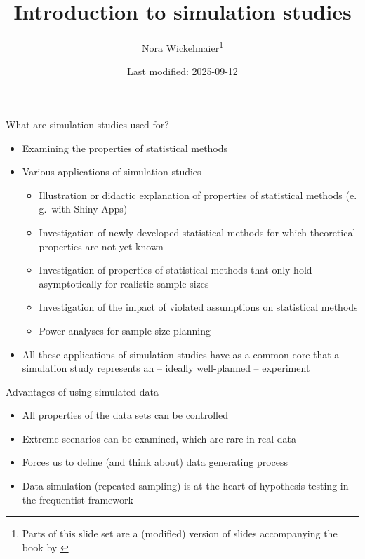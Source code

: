 \documentclass[aspectratio=169]{beamer}
\title{Introduction to simulation studies}
\author{Nora Wickelmaier\footnote{Parts of this slide set are a (modified)
version of slides accompanying the book by \citet{Strobl2024}}}
\date{Last modified: 2025-09-12}
\begin{document}
\begin{frame}{}
\thispagestyle{empty}
\titlepage
\end{frame}


\begin{frame}{What are simulation studies used for?}
  \begin{itemize}
    \item Examining the properties of statistical methods
    \item Various applications of simulation studies
      \begin{itemize}
        \item Illustration or didactic explanation of properties of statistical
          methods (e.\,g.\ with Shiny Apps)
        \item Investigation of newly developed statistical methods for which
          theoretical properties are not yet known
        \item Investigation of properties of statistical methods that only hold
          asymptotically for realistic sample sizes
        \item Investigation of the impact of violated assumptions on statistical
          methods
        \item Power analyses for sample size planning
      \end{itemize}
    \item All these applications of simulation studies have as a common core
      that a simulation study represents an -- ideally well-planned --
      experiment
  \end{itemize}
  \vfill
\end{frame}

\begin{frame}{Advantages of using simulated data}
  \begin{itemize}
    \item All properties of the data sets can be controlled
    \item Extreme scenarios can be examined, which are rare in real data
    \item Forces us to define (and think about) data generating process
    \item Data simulation (repeated sampling) is at the heart of hypothesis
      testing in the frequentist framework
  \end{itemize}
  \vfill
\end{frame}
\end{document}
